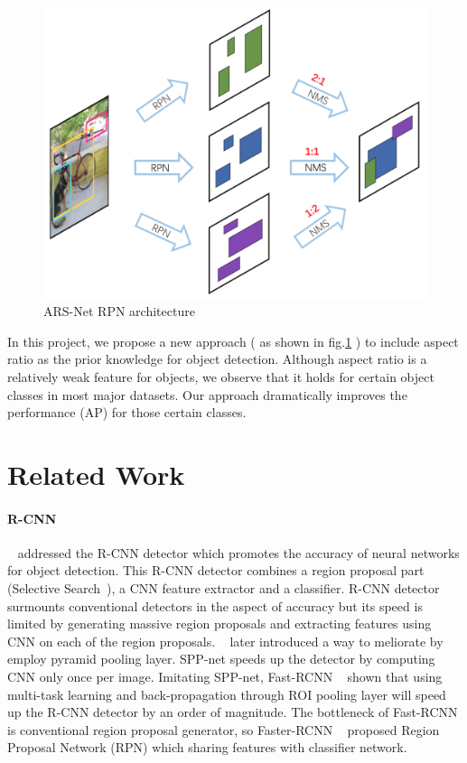 \documentclass[10pt,twocolumn,letterpaper]{article}
\begin{document}
\begin{figure}[h]
\centering
\includegraphics[width=1\linewidth]{pic/ARS-archi-abstract.png}
\caption{ARS-Net RPN architecture}
\label{fig:ARS-archi}
\end{figure}

\par
In this project, we propose a new approach ( as shown in fig.\ref{fig:ARS-archi} ) to include aspect ratio as the prior knowledge for object detection. Although aspect ratio is a relatively weak feature for objects, we observe that it holds for certain object classes in most major datasets. Our approach dramatically improves the performance (AP) for those certain classes.

\section{Related Work}
    \label{sec:related-work}
\paragraph{R-CNN}
~\citet{RCNN} addressed the R-CNN detector which promotes the accuracy of neural networks for object detection. This R-CNN detector combines a region proposal part (Selective Search~\cite{SelectiveSearch}), a CNN feature extractor and a classifier. R-CNN detector surmounts conventional detectors in the aspect of accuracy but its speed is limited by generating massive region proposals and extracting features using CNN on each of the region proposals. ~\citet{SPP} later introduced a way to meliorate by employ pyramid pooling layer. SPP-net speeds up the detector by computing CNN only once per image. Imitating SPP-net, Fast-RCNN ~\cite{fastRCNN} shown that using multi-task learning and back-propagation through ROI pooling layer will speed up the R-CNN detector by an order of magnitude. The bottleneck of Fast-RCNN is conventional region proposal generator, so Faster-RCNN ~\cite{fasterRCNN} proposed Region Proposal Network (RPN) which sharing features with classifier network.
\end{document}
